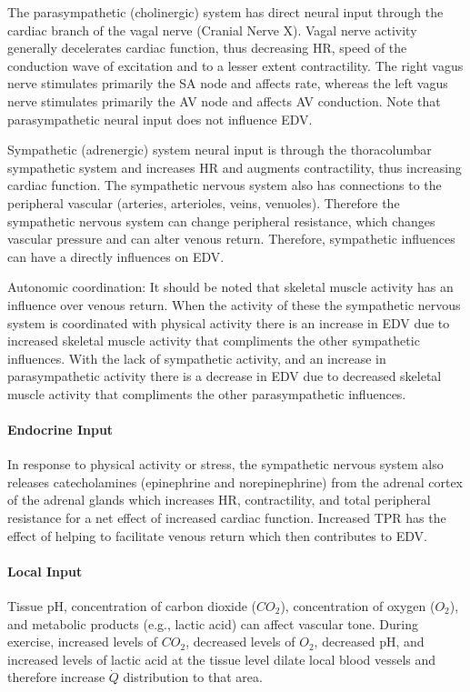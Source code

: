 The parasympathetic (cholinergic) system has direct neural input through the cardiac branch of the vagal nerve (Cranial Nerve X). Vagal nerve activity generally decelerates cardiac function, thus decreasing HR, speed of the conduction wave of excitation and to a lesser extent contractility. The right vagus nerve stimulates primarily the SA node and affects rate, whereas the left vagus nerve stimulates primarily the AV node and affects AV conduction. Note that parasympathetic neural input does not influence EDV. 

Sympathetic (adrenergic) system neural input is through the thoracolumbar sympathetic system and increases HR and augments contractility, thus increasing cardiac function. The sympathetic nervous system also has connections to the peripheral vascular (arteries, arterioles, veins, venuoles). Therefore the sympathetic nervous system can change peripheral resistance, which changes vascular pressure and can alter venous return. Therefore, sympathetic influences can have a directly influences on EDV. 

Autonomic coordination: It should be noted that skeletal muscle activity has an influence over venous return. When the activity of these the sympathetic nervous system is coordinated with physical activity there is an increase in EDV due to increased skeletal muscle activity that compliments the other sympathetic influences. With the lack of sympathetic activity, and an increase in parasympathetic activity there is a decrease in EDV due to decreased skeletal muscle activity that compliments the other parasympathetic influences. 

\paragraph{Endocrine Input}
In response to physical activity or stress, the sympathetic nervous system also releases catecholamines (epinephrine and norepinephrine) from the adrenal cortex of the adrenal glands which increases HR, contractility, and total peripheral resistance for a net effect of increased cardiac function. Increased TPR has the effect of helping to facilitate venous return which then contributes to EDV.

\paragraph{Local Input}
Tissue pH, concentration of carbon dioxide ($CO_2$), concentration of oxygen ($O_2$), and metabolic products (e.g., lactic acid) can affect vascular tone. During exercise, increased levels of $CO_2$, decreased levels of $O_2$, decreased pH, and increased levels of lactic acid at the tissue level dilate local blood vessels and therefore increase $\dot{Q}$ distribution to that area.

